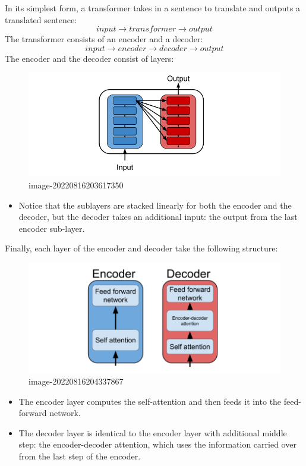 \documentclass[
]{book}
\providecommand{\tightlist}{%
  \setlength{\itemsep}{0pt}\setlength{\parskip}{0pt}}
\begin{document}
In its simplest form, a transformer takes in a sentence to translate and outputs a translated sentence:
\[
input \to transformer \to output
\]
The transformer consists of an encoder and a decoder:
\[
input \to encoder \to decoder \to output
\]
The encoder and the decoder consist of layers:

\begin{figure}
\centering
\includegraphics{Figures/transformers_02.png}
\caption{image-20220816203617350}
\end{figure}

\begin{itemize}
\tightlist
\item
  Notice that the sublayers are stacked linearly for both the encoder and the decoder, but the decoder takes an additional input: the output from the last encoder sub-layer.
\end{itemize}

Finally, each layer of the encoder and decoder take the following structure:

\begin{figure}
\centering
\includegraphics{Figures/transformers_03.png}
\caption{image-20220816204337867}
\end{figure}

\begin{itemize}
\tightlist
\item
  The encoder layer computes the self-attention and then feeds it into the feed-forward network.
\item
  The decoder layer is identical to the encoder layer with additional middle step: the encoder-decoder attention, which uses the information carried over from the last step of the encoder.
\end{itemize}
\end{document}
